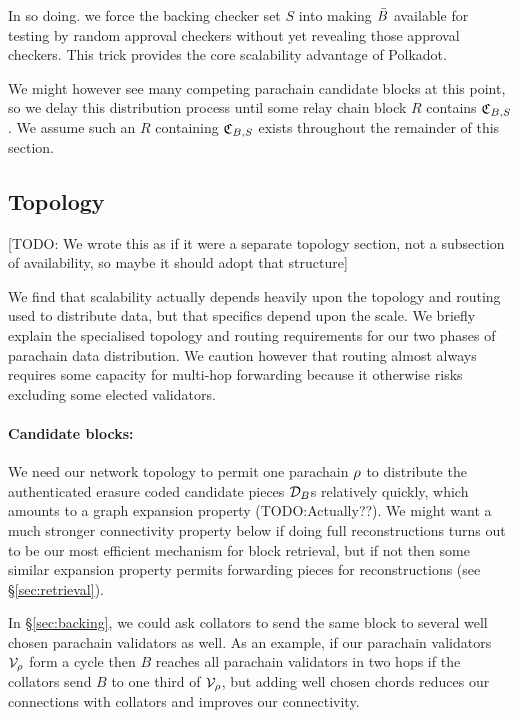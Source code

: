In so doing. we force the backing checker set $S$ into making $\bar{B}$ available for testing by random approval checkers without yet revealing those approval checkers.  This trick provides the core scalability advantage of Polkadot.

We might however see many competing parachain candidate blocks at this point, so we delay this distribution process until some relay chain block $R$ contains $\mathfrak{C}_{B,S}$.  We assume such an $R$ containing $\mathfrak{C}_{B,S}$ exists throughout the remainder of this section.


\subsection{Topology}
\label{sec:topology}

[TODO: We wrote this as if it were a separate topology section, not a subsection of availability, so maybe it should adopt that structure]

We find that scalability actually depends heavily upon the topology and routing used to distribute data, but that specifics depend upon the scale.  We briefly explain the specialised topology and routing requirements for our two phases of parachain data distribution.  We caution however that routing almost always requires some capacity for multi-hop forwarding because it otherwise risks excluding some elected validators.  

\smallskip
\paragraph{Candidate blocks:}

We need our network topology to permit one parachain $\rho$ to distribute the authenticated erasure coded candidate pieces $\mathcal{D}_B$s relatively quickly, which amounts to a graph expansion property (TODO:Actually??).  We might want a much stronger connectivity property below if doing full reconstructions turns out to be our most efficient mechanism for block retrieval, but if not then some similar expansion property permits forwarding pieces for reconstructions (see \S\ref{sec:retrieval}).

In \S\ref{sec:backing}, we could ask collators to send the same block to several well chosen parachain validators as well.  As an example, if our parachain validators $\mathcal{V}_{\rho}$ form a cycle then $B$ reaches all parachain validators in two hops if the collators send $B$ to one third of $\mathcal{V}_{\rho}$, but adding well chosen chords reduces our connections with collators and improves our connectivity.  

